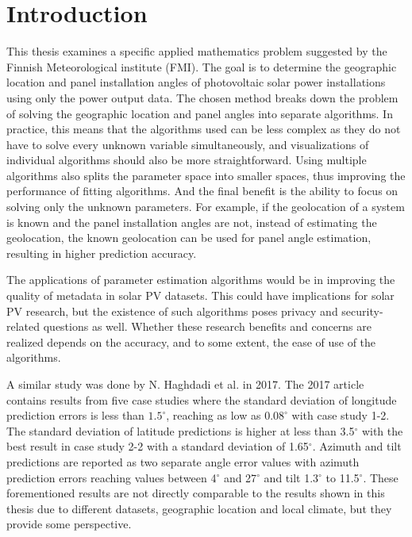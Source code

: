 \chapter{Introduction}

This thesis examines a specific applied mathematics problem suggested by the Finnish Meteorological institute (FMI). The goal is to determine the geographic location and panel installation angles of photovoltaic solar power installations using only the power output data. The chosen method breaks down the problem of solving the geographic location and panel angles into separate algorithms. In practice, this means that the algorithms used can be less complex as they do not have to solve every unknown variable simultaneously, and visualizations of individual algorithms should also be more straightforward. Using multiple algorithms also splits the parameter space into smaller spaces, thus improving the performance of fitting algorithms. And the final benefit is the ability to focus on solving only the unknown parameters. For example, if the geolocation of a system is known and the panel installation angles are not, instead of estimating the geolocation, the known geolocation can be used for panel angle estimation, resulting in higher prediction accuracy.


The applications of parameter estimation algorithms would be in improving the quality of metadata in solar PV datasets. This could have implications for solar PV research, but the existence of such algorithms poses privacy and security-related questions as well. Whether these research benefits and concerns are realized depends on the accuracy, and to some extent, the ease of use of the algorithms.



A similar study was done by N. Haghdadi et al. in 2017\cite{navid_australian_article}. The 2017 article contains results from five case studies where the standard deviation of longitude prediction errors is less than $1.5^\circ$, reaching as low as $0.08^\circ$ with case study 1-2. The standard deviation of latitude predictions is higher at less than 3.5$^\circ$ with the best result in case study 2-2 with a standard deviation of 1.65$^\circ$. Azimuth and tilt predictions are reported as two separate angle error values with azimuth prediction errors reaching values between 4$^\circ$ and 27$^\circ$ and tilt 1.3$^\circ$ to 11.5$^\circ$. These forementioned results are not directly comparable to the results shown in this thesis due to different datasets, geographic location and local climate, but they provide some perspective.



